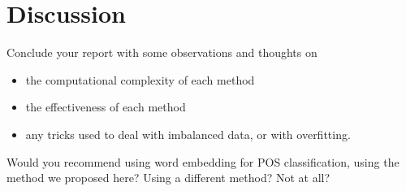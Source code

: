 \documentclass{article}
\begin{document}
\section{Discussion}
Conclude your report with some observations and thoughts on 
\begin{itemize}
\item the computational complexity of each method
\item the effectiveness of each method
\item any tricks used to deal with imbalanced data, or with overfitting.
\end{itemize}

Would you recommend using word embedding for POS classification, using the method we proposed here? Using a different method? Not at all?
\end{document}
